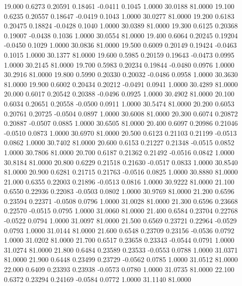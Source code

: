   19.000   0.6273   0.20591   0.18461  -0.0411   0.1045   1.0000  30.0188  81.0000
  19.100   0.6235   0.20557   0.18647  -0.0419   0.1043   1.0000  30.0277  81.0000
  19.200   0.6183   0.20475   0.18824  -0.0428   0.1040   1.0000  30.0389  81.0000
  19.300   0.6125   0.20368   0.19007  -0.0438   0.1036   1.0000  30.0554  81.0000
  19.400   0.6064   0.20245   0.19204  -0.0450   0.1029   1.0000  30.0836  81.0000
  19.500   0.6009   0.20149   0.19424  -0.0463   0.1015   1.0000  30.1377  81.0000
  19.600   0.5985   0.20159   0.19643  -0.0473   0.0995   1.0000  30.2145  81.0000
  19.700   0.5983   0.20234   0.19844  -0.0480   0.0976   1.0000  30.2916  81.0000
  19.800   0.5990   0.20330   0.20032  -0.0486   0.0958   1.0000  30.3630  81.0000
  19.900   0.6002   0.20434   0.20212  -0.0491   0.0941   1.0000  30.4289  81.0000
  20.000   0.6017   0.20542   0.20388  -0.0496   0.0925   1.0000  30.4902  81.0000
  20.100   0.6034   0.20651   0.20558  -0.0500   0.0911   1.0000  30.5474  81.0000
  20.200   0.6053   0.20761   0.20725  -0.0504   0.0897   1.0000  30.6008  81.0000
  20.300   0.6074   0.20872   0.20887  -0.0507   0.0885   1.0000  30.6505  81.0000
  20.400   0.6097   0.20986   0.21046  -0.0510   0.0873   1.0000  30.6970  81.0000
  20.500   0.6123   0.21103   0.21199  -0.0513   0.0862   1.0000  30.7402  81.0000
  20.600   0.6153   0.21227   0.21348  -0.0515   0.0852   1.0000  30.7806  81.0000
  20.700   0.6187   0.21362   0.21492  -0.0516   0.0842   1.0000  30.8184  81.0000
  20.800   0.6229   0.21518   0.21630  -0.0517   0.0833   1.0000  30.8540  81.0000
  20.900   0.6281   0.21715   0.21763  -0.0516   0.0825   1.0000  30.8880  81.0000
  21.000   0.6355   0.22003   0.21896  -0.0513   0.0816   1.0000  30.9222  81.0000
  21.100   0.6550   0.22936   0.22083  -0.0503   0.0802   1.0000  30.9769  81.0000
  21.200   0.6596   0.23594   0.22371  -0.0508   0.0796   1.0000  31.0028  81.0000
  21.300   0.6596   0.23668   0.22570  -0.0515   0.0795   1.0000  31.0060  81.0000
  21.400   0.6584   0.23704   0.22768  -0.0522   0.0794   1.0000  31.0097  81.0000
  21.500   0.6569   0.23721   0.22964  -0.0529   0.0793   1.0000  31.0144  81.0000
  21.600   0.6548   0.23709   0.23156  -0.0536   0.0792   1.0000  31.0202  81.0000
  21.700   0.6517   0.23658   0.23343  -0.0544   0.0791   1.0000  31.0274  81.0000
  21.800   0.6484   0.23589   0.23533  -0.0553   0.0788   1.0000  31.0371  81.0000
  21.900   0.6448   0.23499   0.23729  -0.0562   0.0785   1.0000  31.0512  81.0000
  22.000   0.6409   0.23393   0.23938  -0.0573   0.0780   1.0000  31.0735  81.0000
  22.100   0.6372   0.23294   0.24169  -0.0584   0.0772   1.0000  31.1140  81.0000
